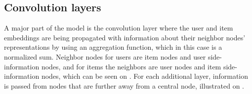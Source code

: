 \subsection{Convolution layers}\label{subsec:csgcn_is_conv_layer}
A major part of the model is the convolution layer where the user and item embeddings are being propagated with information about their neighbor nodes' representations by using an aggregation function, which in this case is a normalized sum.
Neighbor nodes for users are item nodes and user side-information nodes, and for items the neighbors are user nodes and item side-information nodes, which can be seen on .
For each additional layer, information is passed from nodes that are further away from a central node, illustrated on .
\begin{figure}[h]
    \centering
    
    \begin{tikzpicture}[x=0.5pt,y=0.5pt,yscale=-1,xscale=1]
    

\end{tikzpicture}
\end{figure}
